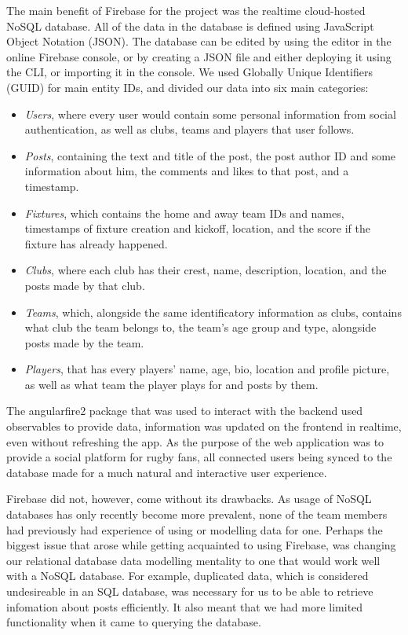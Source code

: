 \documentclass{l3proj}
\begin{document}
The main benefit of Firebase for the project was the realtime cloud-hosted
 NoSQL database. All of the data in the database is defined using JavaScript
 Object Notation (JSON). The database can be edited by using the editor
 in the online Firebase console, or by creating a JSON file and either deploying
 it using the CLI, or importing it in the console. We used Globally Unique
 Identifiers (GUID) for main entity IDs, and divided our data into six main categories:
\begin{itemize}
\item
\textit{Users}, where every user would contain some personal information
 from social authentication, as well as clubs, teams and players that user
 follows.

\item
\textit{Posts}, containing the text and title of the post, the post
 author ID and some information about him, the comments and likes to
 that post, and a timestamp.

\item
\textit{Fixtures}, which contains the home and away team IDs and names,
 timestamps of fixture creation and kickoff, location, and the score if
 the fixture has already happened.

\item
\textit{Clubs}, where each club has their crest, name, description,
location, and the posts made by that club.

\item
\textit{Teams}, which, alongside the same identificatory information as
clubs, contains what club the team belongs to, the team's age group and
type, alongside posts made by the team.

\item
\textit{Players}, that has every players' name, age, bio, location and
 profile picture, as well as what team the player plays for and posts
 by them.

\end{itemize}
The angularfire2 package that was used to interact with the backend used
 observables to provide data, information was updated on the frontend in
 realtime, even without refreshing the app. As the purpose of the web
 application was to provide a social platform for rugby fans, all connected
 users being synced to the database made for a much natural and interactive
 user experience.



Firebase did not, however, come without its drawbacks. As usage of NoSQL
 databases has only recently become more prevalent, none of the team members
 had previously had experience of using or modelling data for one. Perhaps
 the biggest issue that arose while getting acquainted to using Firebase, was
 changing our relational database data modelling mentality to one that would work
 well with a NoSQL database. For example, duplicated data, which is considered
 undesireable in an SQL database, was necessary for us to be able to retrieve
 infomation about posts efficiently. It also meant that we had more limited
 functionality when it came to querying the database.
\end{document}

